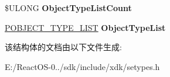 \begin{DoxyCompactItemize}
\item 
\mbox{\label{struct___s_e___a_c_c_e_s_s___r_e_q_u_e_s_t_a06b839cd4e2958f4a53072d645a2b757}} 
\$U\+L\+O\+NG {\bfseries Object\+Type\+List\+Count}
\item 
\mbox{\label{struct___s_e___a_c_c_e_s_s___r_e_q_u_e_s_t_a21d56ab82922b64c8c385d525de6735f}} 
\hyperlink{struct___o_b_j_e_c_t___t_y_p_e___l_i_s_t}{P\+O\+B\+J\+E\+C\+T\+\_\+\+T\+Y\+P\+E\+\_\+\+L\+I\+ST} {\bfseries Object\+Type\+List}
\end{DoxyCompactItemize}


该结构体的文档由以下文件生成\+:\begin{DoxyCompactItemize}
\item 
E\+:/\+React\+O\+S-\/0../sdk/include/xdk/setypes.\+h\end{DoxyCompactItemize}
